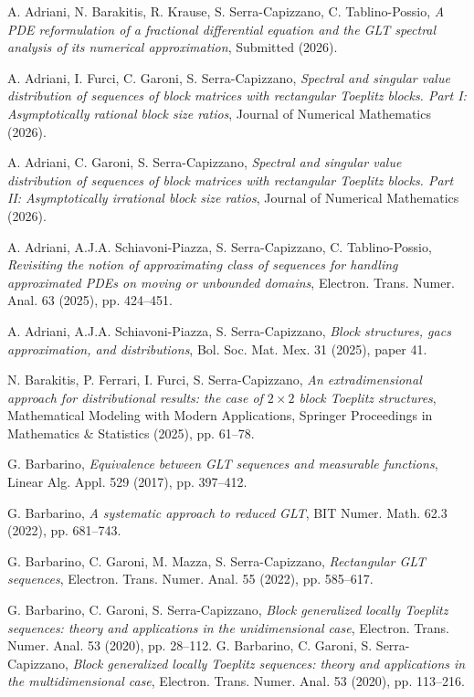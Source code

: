 \documentclass{amsart}
\begin{document}
\begin{thebibliography}{}

 A. Adriani, N. Barakitis, R. Krause, S. Serra-Capizzano, C. Tablino-Possio, {\it A PDE reformulation of a fractional differential equation and the GLT spectral analysis of its numerical approximation}, Submitted (2026).

 A. Adriani, I. Furci, C. Garoni, S. Serra-Capizzano, {\it Spectral and singular value distribution of sequences of block matrices with rectangular Toeplitz blocks. Part I: Asymptotically rational block size ratios}, Journal of Numerical Mathematics (2026). 

 A. Adriani, C. Garoni, S. Serra-Capizzano, {\it Spectral and singular value distribution of sequences of block matrices with rectangular Toeplitz blocks. Part II: Asymptotically irrational block size ratios}, Journal of Numerical Mathematics (2026).

 A. Adriani, A.J.A. Schiavoni-Piazza, S. Serra-Capizzano, C. Tablino-Possio, {\it Revisiting the notion of approximating class of sequences for handling approximated PDEs on moving or unbounded domains}, Electron. Trans. Numer. Anal. 63 (2025), pp. 424–451.

 A. Adriani, A.J.A. Schiavoni-Piazza, S. Serra-Capizzano, {\it Block structures, gacs approximation, and distributions}, Bol. Soc. Mat. Mex. 31 (2025), paper 41.

 N. Barakitis, P. Ferrari, I. Furci, S. Serra-Capizzano, {\it An extradimensional approach for distributional results: the case of $2 \times 2$ block Toeplitz structures}, Mathematical Modeling with Modern Applications, Springer Proceedings in Mathematics $\&$ Statistics (2025), pp. 61–78. 

 G. Barbarino, {\it Equivalence between GLT sequences and measurable functions}, Linear Alg. Appl. 529 (2017), pp. 397–412.

 G. Barbarino, {\it A systematic approach to reduced GLT}, BIT Numer. Math. 62.3 (2022), pp. 681–743.

 G. Barbarino, C. Garoni, M. Mazza, S. Serra-Capizzano, {\it Rectangular GLT sequences},  Electron. Trans. Numer. Anal. 55 (2022), pp. 585–617.

%
 G. Barbarino, C. Garoni, S. Serra-Capizzano, {\it Block generalized locally Toeplitz sequences: theory and applications in the unidimensional case}, Electron. Trans. Numer. Anal. 53 (2020), pp. 28–112.
%
 G. Barbarino, C. Garoni, S. Serra-Capizzano, {\it Block generalized locally Toeplitz sequences: theory and applications in the multidimensional case},  Electron. Trans. Numer. Anal. 53 (2020), pp. 113–216.


\end{thebibliography}
\end{document}
